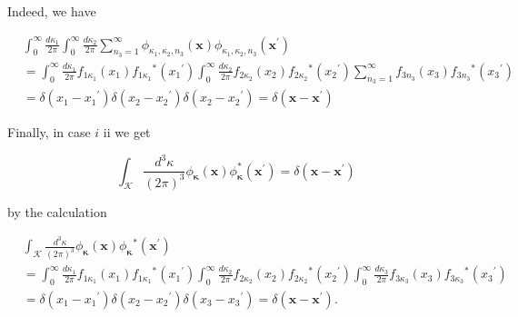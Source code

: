 \documentclass{article}
\begin{document}
Indeed, we have
 
\begin{align*}
& \int_{0}^{\infty} \frac{d \kappa_{1}}{2 \pi} \int_{0}^{\infty} \frac{d \kappa_{2}}{2 \pi} \sum_{n_{3}=1}^{\infty} \phi_{\kappa_{1}, \kappa_{2}, n_{3}}(\boldsymbol{x}) \phi_{\kappa_{1}, \kappa_{2}, n_{3}}\left(\boldsymbol{x}^{\prime}\right)  \tag{3.15.80}\\
& =\int_{0}^{\infty} \frac{d \kappa_{1}}{2 \pi} f_{1 \kappa_{1}}\left(x_{1}\right) f_{1 \kappa_{1}}{ }^{*}\left(x_{1}{ }^{\prime}\right) \int_{0}^{\infty} \frac{d \kappa_{2}}{2 \pi} f_{2 \kappa_{2}}\left(x_{2}\right) f_{2 \kappa_{2}}{ }^{*}\left(x_{2}{ }^{\prime}\right) \sum_{n_{3}=1}^{\infty} f_{3 n_{3}}\left(x_{3}\right) f_{3 n_{3}}{ }^{*}\left(x_{3}{ }^{\prime}\right) \\
& =\delta\left(x_{1}-x_{1}{ }^{\prime}\right) \delta\left(x_{2}-x_{2}{ }^{\prime}\right) \delta\left(x_{2}-x_{2}{ }^{\prime}\right)=\delta\left(\boldsymbol{x}-\boldsymbol{x}^{\prime}\right)
\end{align*}
 

Finally, in case $i$ ii we get
 
\begin{equation*}
\int_{\mathcal{K}} \frac{d^{3} \kappa}{(2 \pi)^{3}} \phi_{\boldsymbol{\kappa}}(\boldsymbol{x}) \phi_{\boldsymbol{\kappa}}^{*}\left(\boldsymbol{x}^{\prime}\right)=\delta\left(\boldsymbol{x}-\boldsymbol{x}^{\prime}\right) \tag{3.15.81}
\end{equation*}
 
by the calculation
 
\begin{align*}
& \int_{\mathcal{K}} \frac{d^{3} \kappa}{(2 \pi)^{3}} \phi_{\boldsymbol{\kappa}}(\boldsymbol{x}) \phi_{\boldsymbol{\kappa}}{ }^{*}\left(\boldsymbol{x}^{\prime}\right)  \tag{3.15.82}\\
& =\int_{0}^{\infty} \frac{d \kappa_{1}}{2 \pi} f_{1 \kappa_{1}}\left(x_{1}\right) f_{1 \kappa_{1}}{ }^{*}\left(x_{1}{ }^{\prime}\right) \int_{0}^{\infty} \frac{d \kappa_{2}}{2 \pi} f_{2 \kappa_{2}}\left(x_{2}\right) f_{2 \kappa_{2}}{ }^{*}\left(x_{2}{ }^{\prime}\right) \int_{0}^{\infty} \frac{d \kappa_{3}}{2 \pi} f_{3 \kappa_{3}}\left(x_{3}\right) f_{3 \kappa_{3}}{ }^{*}\left(x_{3}{ }^{\prime}\right) \\
& =\delta\left(x_{1}-x_{1}{ }^{\prime}\right) \delta\left(x_{2}-x_{2}{ }^{\prime}\right) \delta\left(x_{3}-x_{3}{ }^{\prime}\right)=\delta\left(\boldsymbol{x}-\boldsymbol{x}^{\prime}\right) .
\end{align*}
 
\end{document}
